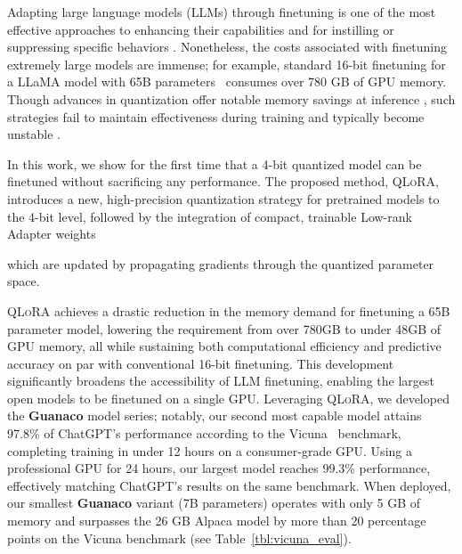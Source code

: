 Adapting large language models (LLMs) through finetuning is one of the most effective approaches to enhancing their capabilities \citep{min2021metaicl, wei2021finetuned, ouyang2022training, wang2022super, wang2022self, liu2022few} and for instilling or suppressing specific behaviors \citep{ouyang2022training,askell2021general,bai2022training}. Nonetheless, the costs associated with finetuning extremely large models are immense; for example, standard 16-bit finetuning for a LLaMA model with 65B parameters~\citep{touvron2023llama} consumes over 780 GB of GPU memory. Though advances in quantization offer notable memory savings at inference \citep{dettmers2022llm, dettmers2022case, frantar2022gptq, xiao2022smoothquant}, such strategies fail to maintain effectiveness during training and typically become unstable \citep{wortsman2023stable}.

In this work, we show for the first time that a 4-bit quantized model can be finetuned without sacrificing any performance. The proposed method, \textsc{QLoRA}, introduces a new, high-precision quantization strategy for pretrained models to the 4-bit level, followed by the integration of compact, trainable Low-rank Adapter weights \citep{hu2021lora} 

which are updated by propagating gradients through the quantized parameter space.

\textsc{QLoRA} achieves a drastic reduction in the memory demand for finetuning a 65B parameter model, lowering the requirement from over 780GB to under 48GB of GPU memory, all while sustaining both computational efficiency and predictive accuracy on par with conventional 16-bit finetuning. This development significantly broadens the accessibility of LLM finetuning, enabling the largest open models to be finetuned on a single GPU. Leveraging \textsc{QLoRA}, we developed the \textbf{Guanaco} model series; notably, our second most capable model attains 97.8\% of ChatGPT's performance according to the Vicuna~\citep{vicuna2023} benchmark, completing training in under 12 hours on a consumer-grade GPU. Using a professional GPU for 24 hours, our largest model reaches 99.3\% performance, effectively matching ChatGPT's results on the same benchmark. When deployed, our smallest \textbf{Guanaco} variant (7B parameters) operates with only 5 GB of memory and surpasses the 26 GB Alpaca model by more than 20 percentage points on the Vicuna benchmark (see Table~\ref{tbl:vicuna_eval}).

